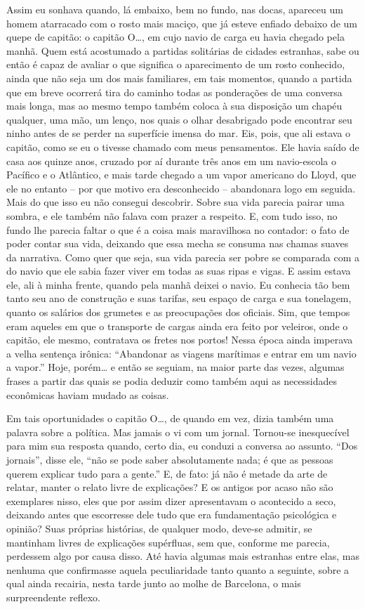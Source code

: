 Assim eu sonhava quando, lá embaixo, bem no fundo, nas docas, apareceu
um homem atarracado com o rosto mais maciço, que já esteve enfiado
debaixo de um quepe de capitão: o capitão O\ldots{}, em cujo navio de carga
eu havia chegado pela manhã. Quem está acostumado a partidas solitárias
de cidades estranhas, sabe ou então é capaz de avaliar o que significa o
aparecimento de um rosto conhecido, ainda que não seja um dos mais
familiares, em tais momentos, quando a partida que em breve ocorrerá
tira do caminho todas as ponderações de uma conversa mais longa, mas ao
mesmo tempo também coloca à sua disposição um chapéu qualquer, uma mão,
um lenço, nos quais o olhar desabrigado pode encontrar seu ninho antes
de se perder na superfície imensa do mar. Eis, pois, que ali estava o
capitão, como se eu o tivesse chamado com meus pensamentos. Ele havia
saído de casa aos quinze anos, cruzado por aí durante três anos em um
navio-escola o Pacífico e o Atlântico, e mais tarde chegado a um vapor
americano do Lloyd, que ele no entanto -- por que motivo era
desconhecido -- abandonara logo em seguida. Mais do que isso eu não
consegui descobrir. Sobre sua vida parecia pairar uma sombra, e ele
também não falava com prazer a respeito. E, com tudo isso, no fundo lhe
parecia faltar o que é a coisa mais maravilhosa no contador: o fato de
poder contar sua vida, deixando que essa mecha se consuma nas chamas
suaves da narrativa. Como quer que seja, sua vida parecia ser pobre se
comparada com a do navio que ele sabia fazer viver em todas as suas
ripas e vigas. E assim estava ele, ali à minha frente, quando pela manhã
deixei o navio. Eu conhecia tão bem tanto seu ano de construção e suas
tarifas, seu espaço de carga e sua tonelagem, quanto os salários dos
grumetes e as preocupações dos oficiais. Sim, que tempos eram aqueles em
que o transporte de cargas ainda era feito por veleiros, onde o capitão,
ele mesmo, contratava os fretes nos portos! Nessa época ainda imperava a
velha sentença irônica: ``Abandonar as viagens marítimas e entrar em um
navio a vapor.'' Hoje, porém\ldots{} e então se seguiam, na maior parte das
vezes, algumas frases a partir das quais se podia deduzir como também
aqui as necessidades econômicas haviam mudado as coisas.

Em tais oportunidades o capitão O\ldots{}, de quando em vez, dizia também uma
palavra sobre a política. Mas jamais o vi com um jornal. Tornou-se
inesquecível para mim sua resposta quando, certo dia, eu conduzi a
conversa ao assunto. ``Dos jornais'', disse ele, ``não se pode saber
absolutamente nada; é que as pessoas querem explicar tudo para a
gente.'' E, de fato: já não é metade da arte de relatar, manter o relato
livre de explicações? E os antigos por acaso não são exemplares nisso,
eles que por assim dizer apresentavam o acontecido a seco, deixando
antes que escorresse dele tudo que era fundamentação psicológica e
opinião? Suas próprias histórias, de qualquer modo, deve-se admitir, se
mantinham livres de explicações supérfluas, sem que, conforme me
parecia, perdessem algo por causa disso. Até havia algumas mais
estranhas entre elas, mas nenhuma que confirmasse aquela peculiaridade
tanto quanto a seguinte, sobre a qual ainda recairia, nesta tarde junto
ao molhe de Barcelona, o mais surpreendente reflexo.

